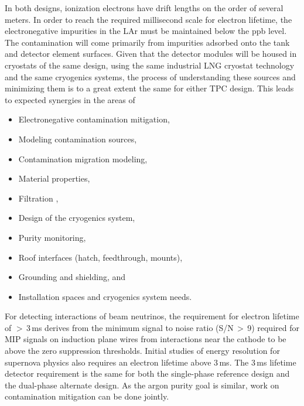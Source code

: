 In both designs, ionization electrons have drift lengths on the order
of several meters. In order to reach the required millisecond scale for
electron lifetime, the electronegative impurities in the LAr must be
maintained below the ppb level. The contamination will
come primarily from impurities adsorbed onto the tank and detector element surfaces.
Given that the detector modules will be housed in cryostats of the same design,
using the same industrial LNG cryostat technology and the same cryogenics systems,
the process of understanding these sources and minimizing them
is to a great extent the same for either TPC design. This leads to %
expected synergies in the areas of
\begin{itemize}
\item Electronegative contamination mitigation, 
\item Modeling contamination sources,
\item Contamination migration modeling,
\item Material properties,
\item Filtration	,
\item Design of the cryogenics system,
\item Purity monitoring,	
\item Roof interfaces (hatch, feedthrough, mounts),
\item Grounding and shielding, and
\item Installation spaces and cryogenics system needs.	
\end{itemize}



For detecting interactions of beam neutrinos, the requirement for
electron lifetime of $>$\,3\,ms derives from the minimum signal to noise
ratio (S/N$\,>\,$9) required for MIP signals on induction plane wires from
interactions near the cathode to be above the zero suppression
thresholds.  Initial studies of energy resolution for supernova physics
also requires an electron lifetime above 3\,ms.  The 3\,ms lifetime
detector requirement is the same for both the single-phase reference
design and the dual-phase alternate design.  As the argon purity goal
is similar, work on contamination mitigation can be done jointly.

